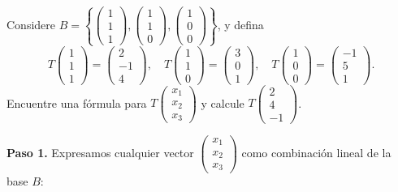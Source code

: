 \begin{prob}
Considere $B=\left\lbrace \begin{pmatrix} 1 \\ 1 \\ 1 \end{pmatrix}, \begin{pmatrix} 1 \\ 1 \\ 0 \end{pmatrix}, \begin{pmatrix} 1 \\ 0 \\ 0 \end{pmatrix} \right\rbrace$, y defina
\[
T\begin{pmatrix} 1 \\ 1 \\ 1 \end{pmatrix} = \begin{pmatrix} 2 \\ -1 \\ 4 \end{pmatrix}, \quad
T\begin{pmatrix} 1 \\ 1 \\ 0 \end{pmatrix} = \begin{pmatrix} 3 \\ 0 \\ 1 \end{pmatrix}, \quad
T\begin{pmatrix} 1 \\ 0 \\ 0 \end{pmatrix} = \begin{pmatrix} -1 \\ 5 \\ 1 \end{pmatrix}.
\]
Encuentre una fórmula para $T\begin{pmatrix} x_1 \\ x_2 \\ x_3 \end{pmatrix}$ y calcule $T\begin{pmatrix} 2 \\ 4 \\ -1 \end{pmatrix}$.
\begin{myproof}
\textbf{Paso 1.} Expresamos cualquier vector $\begin{pmatrix} x_1 \\ x_2 \\ x_3 \end{pmatrix}$ como combinación lineal de la base $B$:

\end{myproof}
\end{prob}
